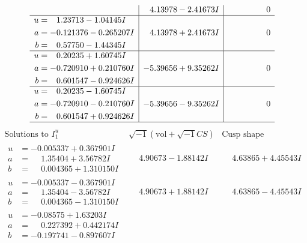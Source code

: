 \documentclass[1p]{elsarticle_modified}
\theoremstyle{definition}
\newcommand{\I}{\sqrt{-1}}
\begin{document}
$$\begin{array}{c|c|c}
 & \phantom{-}4.13978 - 2.41673 I & \phantom{-0.000000 } 0 \\ \hline\begin{aligned}
u &= \phantom{-}1.23713 - 1.04145 I \\
a &= -0.121376 - 0.265207 I \\
b &= \phantom{-}0.57750 - 1.44345 I\end{aligned}
 & \phantom{-}4.13978 + 2.41673 I & \phantom{-0.000000 } 0 \\ \hline\begin{aligned}
u &= \phantom{-}0.20235 + 1.60745 I \\
a &= -0.720910 + 0.210760 I \\
b &= \phantom{-}0.601547 - 0.924626 I\end{aligned}
 & -5.39656 + 9.35262 I & \phantom{-0.000000 } 0 \\ \hline\begin{aligned}
u &= \phantom{-}0.20235 - 1.60745 I \\
a &= -0.720910 - 0.210760 I \\
b &= \phantom{-}0.601547 + 0.924626 I\end{aligned}
 & -5.39656 - 9.35262 I & \phantom{-0.000000 } 0\\
 \hline 
 \end{array}$$\newpage$$\begin{array}{c|c|c}  
\text{Solutions to }I^u_{1}& \I (\text{vol} + \sqrt{-1}CS) & \text{Cusp shape}\\
 \hline 
\begin{aligned}
u &= -0.005337 + 0.367901 I \\
a &= \phantom{-}1.35404 + 3.56782 I \\
b &= \phantom{-}0.004365 + 1.310150 I\end{aligned}
 & \phantom{-}4.90673 - 1.88142 I & \phantom{-}4.63865 + 4.45543 I \\ \hline\begin{aligned}
u &= -0.005337 - 0.367901 I \\
a &= \phantom{-}1.35404 - 3.56782 I \\
b &= \phantom{-}0.004365 - 1.310150 I\end{aligned}
 & \phantom{-}4.90673 + 1.88142 I & \phantom{-}4.63865 - 4.45543 I \\ \hline\begin{aligned}
u &= -0.08575 + 1.63203 I \\
a &= \phantom{-}0.227392 + 0.442174 I \\
b &= -0.197741 - 0.897607 I\end{aligned}

\end{array}$$
\end{document}

